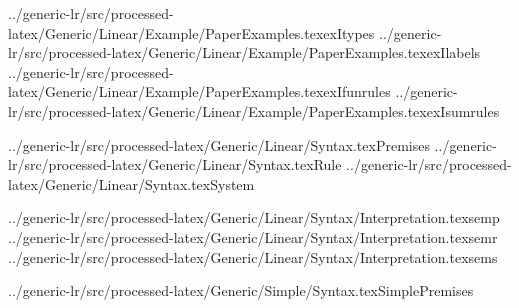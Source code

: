 
\def\prefix{../generic-lr/src/processed-latex}

\CatchFileBetweenTags{\exItypes}%
{\prefix/Generic/Linear/Example/PaperExamples.tex}{exItypes}
\CatchFileBetweenTags{\exIlabels}%
{\prefix/Generic/Linear/Example/PaperExamples.tex}{exIlabels}
\CatchFileBetweenTags{\exIfunrules}%
{\prefix/Generic/Linear/Example/PaperExamples.tex}{exIfunrules}
\CatchFileBetweenTags{\exIsumrules}%
{\prefix/Generic/Linear/Example/PaperExamples.tex}{exIsumrules}

\CatchFileBetweenTags{\Premises}%
{\prefix/Generic/Linear/Syntax.tex}{Premises}
\CatchFileBetweenTags{\Rule}%
{\prefix/Generic/Linear/Syntax.tex}{Rule}
\CatchFileBetweenTags{\System}%
{\prefix/Generic/Linear/Syntax.tex}{System}

\CatchFileBetweenTags{\semp}%
{\prefix/Generic/Linear/Syntax/Interpretation.tex}{semp}
\CatchFileBetweenTags{\semr}%
{\prefix/Generic/Linear/Syntax/Interpretation.tex}{semr}
\CatchFileBetweenTags{\sems}%
{\prefix/Generic/Linear/Syntax/Interpretation.tex}{sems}

\CatchFileBetweenTags{\SimplePremises}%
{\prefix/Generic/Simple/Syntax.tex}{SimplePremises}
